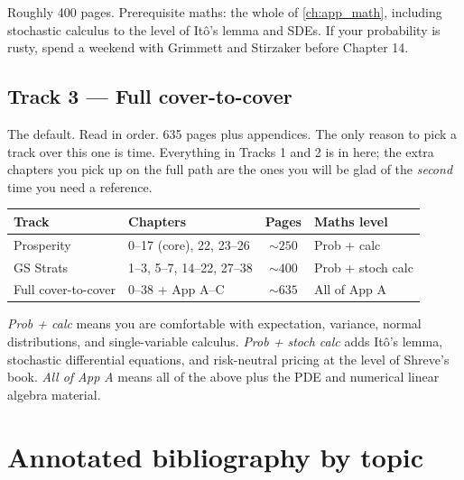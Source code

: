 Roughly 400 pages. Prerequisite maths: the whole of \cref{ch:app_math},
including stochastic calculus to the level of It\^o's lemma and SDEs.
If your probability is rusty, spend a weekend with Grimmett and
Stirzaker before Chapter 14.

\subsection{Track 3 --- Full cover-to-cover}

The default. Read in order. 635 pages plus appendices. The only
reason to pick a track over this one is time. Everything in Tracks 1
and 2 is in here; the extra chapters you pick up on the full path are
the ones you will be glad of the \emph{second} time you need a
reference.

\begin{keyfactbox}
\begin{center}
\small
\begin{tabular}{@{}l l c l@{}}
\toprule
\textbf{Track} & \textbf{Chapters} & \textbf{Pages} & \textbf{Maths level} \\
\midrule
Prosperity         & 0--17 (core), 22, 23--26       & $\sim\!250$ & Prob + calc  \\
GS Strats          & 1--3, 5--7, 14--22, 27--38     & $\sim\!400$ & Prob + stoch calc \\
Full cover-to-cover & 0--38 + App A--C              & $\sim\!635$ & All of App A \\
\bottomrule
\end{tabular}
\end{center}

\noindent\emph{Prob + calc} means you are comfortable with
expectation, variance, normal distributions, and single-variable
calculus. \emph{Prob + stoch calc} adds It\^o's lemma, stochastic
differential equations, and risk-neutral pricing at the level of
Shreve's book. \emph{All of App A} means all of the above plus the
PDE and numerical linear algebra material.
\end{keyfactbox}

\section{Annotated bibliography by topic}
\label{sec:app_biblio_annotated}

